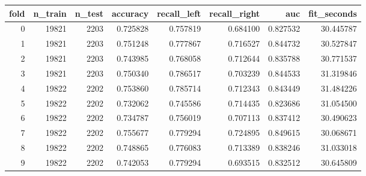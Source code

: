 \begin{tabular}{rrrrrrrr}
\toprule
fold & n_train & n_test & accuracy & recall_left & recall_right & auc & fit_seconds \\
\midrule
0 & 19821 & 2203 & 0.725828 & 0.757819 & 0.684100 & 0.827532 & 30.445787 \\
1 & 19821 & 2203 & 0.751248 & 0.777867 & 0.716527 & 0.844732 & 30.527847 \\
2 & 19821 & 2203 & 0.743985 & 0.768058 & 0.712644 & 0.835788 & 30.771537 \\
3 & 19821 & 2203 & 0.750340 & 0.786517 & 0.703239 & 0.844533 & 31.319846 \\
4 & 19822 & 2202 & 0.753860 & 0.785714 & 0.712343 & 0.843449 & 31.484226 \\
5 & 19822 & 2202 & 0.732062 & 0.745586 & 0.714435 & 0.823686 & 31.054500 \\
6 & 19822 & 2202 & 0.734787 & 0.756019 & 0.707113 & 0.837412 & 30.490623 \\
7 & 19822 & 2202 & 0.755677 & 0.779294 & 0.724895 & 0.849615 & 30.068671 \\
8 & 19822 & 2202 & 0.748865 & 0.776083 & 0.713389 & 0.838246 & 31.033018 \\
9 & 19822 & 2202 & 0.742053 & 0.779294 & 0.693515 & 0.832512 & 30.645809 \\
\bottomrule
\end{tabular}
